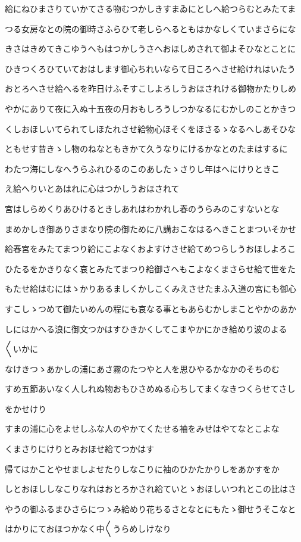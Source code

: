 \documentclass[a4paper,11pt,landscape]{ltjtarticle}
\begin{document}
給にねひまさりていかてさる物むつかしきすまゐにとしへ給つらむとみたてま
\par\medskip
つる女房なとの院の御時さふらひて老しらへるともはかなしくていまさらにな
\par\medskip
きさはきめてきこゆうへもはつかしうさへおほしめされて御よそひなとことに
\par\medskip
ひきつくろひていておはします御心ちれいならて日ころへさせ給けれはいたう
\par\medskip
おとろへさせ給へるを昨日けふそすこしよろしうおほされける御物かたりしめ
\par\medskip
やかにありて夜に入ぬ十五夜の月おもしろうしつかなるにむかしのことかきつ
\par\medskip
くしおほしいてられてしほたれさせ給物心ほそくをほさるゝなるへしあそひな
\par\medskip
ともせす昔きゝし物のねなともきかて久うなりにけるかなとのたまはするに
\par\medskip
わたつ海にしなへうらふれひるのこのあしたゝさりし年はへにけりときこ
\par\medskip
え給へりいとあはれに心はつかしうおほされて
\par\medskip
宮はしらめくりあひけるときしあれはわかれし春のうらみのこすないとな
\par\medskip
まめかしき御ありさまなり院の御ために八講おこなはるへきことまついそかせ
\par\medskip
給春宮をみたてまつり給にこよなくおよすけさせ給てめつらしうおほしよろこ
\par\medskip
ひたるをかきりなく哀とみたてまつり給御さへもこよなくまさらせ給て世をた
\par\medskip
もたせ給はむにはゝかりあるましくかしこくみえさせたまふ入道の宮にも御心
\par\medskip
すこしゝつめて御たいめんの程にも哀なる事ともあらむかしまことやかのあか
\par\medskip
しにはかへる浪に御文つかはすひきかくしてこまやかにかき給めり波のよる
\par\medskip
〱いかに
\par\medskip
なけきつゝあかしの浦にあさ霧のたつやと人を思ひやるかなかのそちのむ
\par\medskip
すめ五節あいなく人しれぬ物おもひさめぬる心ちしてまくなきつくらせてさし
\par\medskip
をかせけり
\par\medskip
すまの浦に心をよせしふな人のやかてくたせる袖をみせはやてなとこよな
\par\medskip
くまさりにけりとみおほせ給てつかはす
\par\medskip
帰てはかことやせましよせたりしなこりに袖のひかたかりしをあかすをか
\par\medskip
しとおほししなこりなれはおとろかされ給ていとゝおほしいつれとこの比はさ
\par\medskip
やうの御ふるまひさらにつゝみ給めり花ちるさとなとにもたゝ御せうそこなと
\par\medskip
はかりにておほつかなく中〱うらめしけなり
\par\medskip
\end{document}
